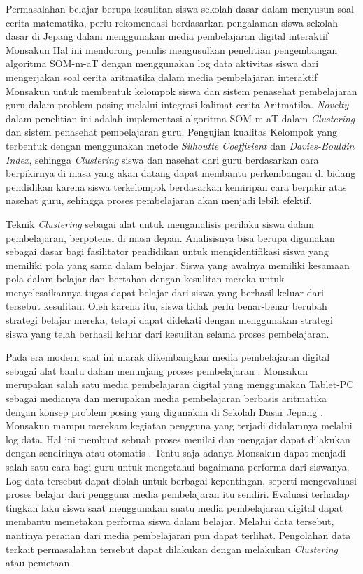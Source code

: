 Permasalahan belajar berupa kesulitan siswa sekolah dasar dalam menyusun soal cerita matematika, perlu rekomendasi berdasarkan pengalaman siswa sekolah dasar di Jepang dalam menggunakan media pembelajaran digital interaktif Monsakun Hal ini mendorong penulis mengusulkan penelitian pengembangan algoritma SOM-m-aT dengan menggunakan log data aktivitas siswa dari mengerjakan soal cerita aritmatika dalam media pembelajaran interaktif Monsakun untuk membentuk kelompok siswa dan sistem penasehat pembelajaran guru dalam problem posing melalui integrasi kalimat cerita Aritmatika. \textit{Novelty} dalam penelitian ini adalah implementasi algoritma SOM-m-aT  dalam \textit{Clustering} dan sistem penasehat pembelajaran guru. Pengujian kualitas Kelompok yang terbentuk dengan menggunakan metode \textit{Silhoutte Coeffisient} dan \textit{Davies-Bouldin Index}, sehingga \textit{Clustering} siswa dan nasehat dari guru berdasarkan cara berpikirnya di masa yang akan datang dapat membantu perkembangan di bidang pendidikan karena siswa terkelompok berdasarkan kemiripan cara berpikir atas nasehat guru, sehingga proses pembelajaran akan menjadi lebih efektif. 

Teknik \textit{Clustering} sebagai alat untuk menganalisis perilaku siswa dalam pembelajaran, berpotensi di masa depan. Analisisnya bisa berupa digunakan sebagai dasar bagi fasilitator pendidikan untuk mengidentifikasi siswa yang memiliki pola yang sama dalam belajar. Siswa yang awalnya memiliki kesamaan pola dalam belajar dan bertahan dengan kesulitan mereka untuk menyelesaikannya tugas dapat belajar dari siswa yang berhasil keluar dari tersebut kesulitan. Oleh karena itu, siswa tidak perlu benar-benar berubah strategi belajar mereka, tetapi dapat didekati dengan menggunakan strategi siswa yang telah berhasil keluar dari kesulitan selama proses pembelajaran.

Pada era modern saat ini marak dikembangkan media pembelajaran digital sebagai alat bantu dalam menunjang proses pembelajaran \cite{Muhasim2017}. Monsakun merupakan   salah   satu   media   pembelajaran   digital   yang   menggunakan   Tablet-PC sebagai medianya   dan   merupakan   media   pembelajaran   berbasis aritmatika dengan konsep problem posing yang digunakan di Sekolah Dasar Jepang \cite{Hasanah2015}. Monsakun mampu merekam kegiatan pengguna yang terjadi didalamnya melalui log data. Hal ini membuat sebuah proses menilai dan mengajar dapat dilakukan dengan sendirinya atau otomatis \cite{SupiantoHayashiHirashima2016}. Tentu saja adanya Monsakun dapat menjadi salah satu cara bagi guru untuk mengetahui bagaimana performa dari siswanya. Log data tersebut dapat diolah untuk berbagai kepentingan, seperti mengevaluasi proses belajar dari pengguna media pembelajaran itu sendiri. Evaluasi terhadap tingkah laku siswa saat menggunakan suatu media pembelajaran digital dapat membantu memetakan performa siswa dalam belajar. Melalui data tersebut, nantinya peranan dari media pembelajaran pun dapat terlihat. Pengolahan data terkait permasalahan tersebut dapat dilakukan dengan melakukan \textit{Clustering} atau pemetaan.

